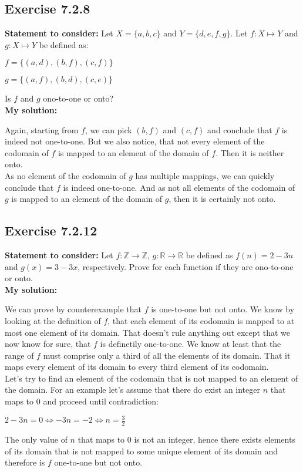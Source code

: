 \documentclass{article}
\newcommand{\cent}[1]{\begin{center}#1\end{center}}
\newcommand{\doubleR}{\mathbb{R}}
\newcommand{\doubleZ}{\mathbb{Z}}
\newcommand{\Remark}{\textbf{Statement to consider: }}
\newcommand{\Solution}{\textbf{My solution: }}
\newcommand{\Exercise}[1]{\subsection*{Exercise #1}}
\begin{document}
 	\Exercise{7.2.8}
 	
 	\Remark
 	Let $X = \{a,b,c\}$ and $Y = \{d,e,f,g\}$. Let $f : X \mapsto Y$ and $g : X \mapsto Y$ be defined as:
 	
 	\cent{$f = \{(a,d),(b,f),(c,f)\}$}
 	\cent{$g = \{(a,f),(b,d),(c,e)\}$}
 	
 	Is $f$ and $g$ ono-to-one or onto?\\
 	
 	\Solution
 	
 	Again, starting from $f$, we can pick $(b,f)$ and $(c,f)$ and conclude that $f$ is indeed not one-to-one. But we also notice, that not every element of the codomain of $f$ is mapped to an element of the domain of $f$. Then it is neither onto.\\
 	
 	As no element of the codomain of $g$ has multiple mappings, we can quickly conclude that $f$ is indeed one-to-one. And as not all elements of the codomain of $g$ is mapped to an element of the domain of $g$, then it is certainly not onto.
 	
 	\Exercise{7.2.12}
 	
 	\Remark
 	Let $f : \doubleZ \to \doubleZ$, $g : \doubleR \to \doubleR $ be defined as $f(n) = 2-3n$ and $g(x) = 3-3x$, respectively. Prove for each function if they are ono-to-one or onto.\\
 	
 	\Solution
 	
 	We can prove by counterexample that $f$ is one-to-one but not onto. We know by looking at the definition of $f$, that each element of its codomain is mapped to at most one element of its domain. That doesn't rule anything out except that we now know for sure, that $f$ is definetily one-to-one. We know at least that the range of $f$ must comprise only a third of all the elements of its domain. That it maps every element of its domain to every third element of its codomain.\\
 	
 	Let's try to find an element of the codomain that is not mapped to an element of the domain. For an example let's assume that there do exist an integer $n$ that maps to 0 and proceed until contradiction:
 	
 	\cent{$2-3n=0 \Leftrightarrow -3n=-2 \Leftrightarrow n = \frac{3}{2}$}
 	
 	The only value of $n$ that maps to 0 is not an integer, hence there exists elements of its domain that is not mapped to some unique element of its domain and therefore is $f$ one-to-one but not onto.\\
 	
\end{document}
